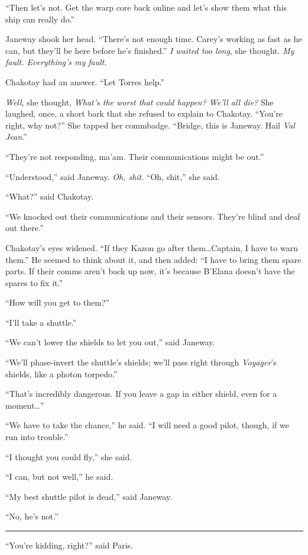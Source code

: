\documentclass[twoside,letterpaper,12pt]{memoir}
\begin{document}
``Then let's not. Get the warp core back online and let's show them what this ship can really do.''

Janeway shook her head. ``There's not enough time. Carey's working as fast as he can, but they'll be here before he's finished.'' \textit{I waited too long}, she thought. \textit{My fault. Everything's my fault.}

Chakotay had an answer. ``Let Torres help.''

\textit{Well}, she thought, \textit{What's the worst that could happen? We'll all die?} She laughed, once, a short bark that she refused to explain to Chakotay. ``You're right, why not?'' She tapped her commbadge. ``Bridge, this is Janeway. Hail \textit{Val Jean}.''

``They're not responding, ma'am. Their communications might be out.''

``Understood,'' said Janeway. \textit{Oh, shit}. ``Oh, shit,'' she said.

``What?'' said Chakotay.

``We knocked out their communications and their sensors. They're blind and deaf out there.''

Chakotay's eyes widened. ``If they Kazon go after them\ldots Captain, I have to warn them.'' He seemed to think about it, and then added: ``I have to bring them spare parts. If their comms aren't back up now, it's because B'Elana doesn't have the spares to fix it.''

``How will you get to them?''

``I'll take a shuttle.''

``We can't lower the shields to let you out,'' said Janeway.

``We'll phase-invert the shuttle's shields; we'll pass right through \textit{Voyager}'s shields, like a photon torpedo.''

``That's incredibly dangerous. If you leave a gap in either shield, even for a moment\ldots ''

``We have to take the chance,'' he said. ``I will need a good pilot, though, if we run into trouble.''

``I thought you could fly,'' she said.

``I can, but not well,'' he said.

``My best shuttle pilot is dead,'' said Janeway.

``No, he's not.''

\fancybreak{\rule{3cm}{0.4 pt}}
``You're kidding, right?'' said Paris.
\end{document}
